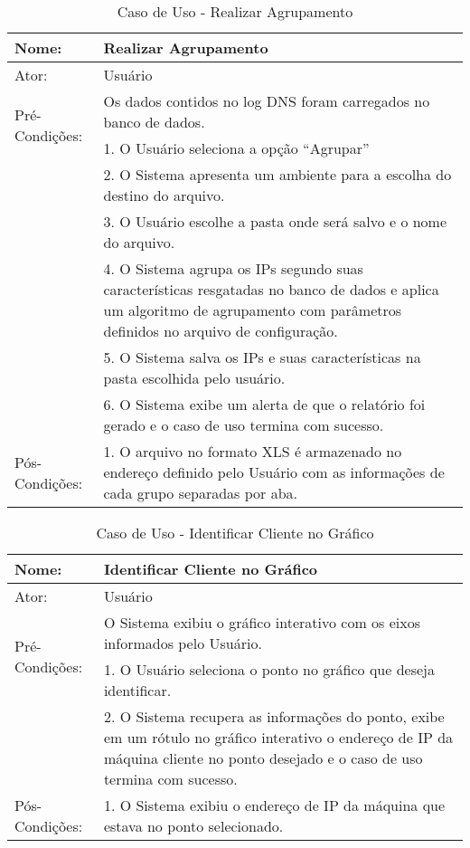 \begin{table}[]
\centering
\caption{Caso de Uso - Realizar Agrupamento}
\label{tab:use_case_clustering}
\begin{tabular}{|lp{10cm}|}
\hline
Nome: & Realizar Agrupamento  \\ \hline
Ator: & Usuário   \\ \hline
\multirow{2}{*}{Pré-Condições:} & Os dados contidos no log DNS foram carregados no banco de dados.  \\ \hline
\multirow{13}{*}{Fluxo Básico de Eventos:} & 1. O Usuário seleciona a opção ``Agrupar''  \\
 & 2. O Sistema apresenta um ambiente para a escolha do destino do arquivo. \\
 & 3. O Usuário escolhe a pasta onde será salvo e o nome do arquivo. \\
 & 4. O Sistema agrupa os IPs segundo suas características resgatadas no banco de dados e aplica um algoritmo de agrupamento com parâmetros definidos no arquivo de configuração.  \\
 & 5. O Sistema salva os IPs e suas características na pasta escolhida pelo usuário. \\
 & 6. O Sistema exibe um alerta de que o relatório foi gerado e o caso de uso termina com sucesso. \\
 \hline
\multirow{3}{*}{Pós-Condições:} & 1. O arquivo no formato XLS é armazenado no endereço definido pelo Usuário com as informações de cada grupo separadas por aba. \\
\hline
\end{tabular}
\end{table}

\begin{table}[]
\centering
\caption{Caso de Uso - Identificar Cliente no Gráfico}
\label{tab:use_case_identify}
\begin{tabular}{|lp{10cm}|}
\hline
Nome: & Identificar Cliente no Gráfico  \\ \hline
Ator: & Usuário   \\ \hline
\multirow{2}{*}{Pré-Condições:} & O Sistema exibiu o gráfico interativo com os eixos informados pelo Usuário.  \\ \hline
\multirow{6}{*}{Fluxo Básico de Eventos:} & 1. O Usuário seleciona o ponto no gráfico que deseja identificar.  \\
 & 2. O Sistema recupera as informações do ponto, exibe em um rótulo no gráfico interativo o endereço de IP da máquina cliente no ponto desejado e o caso de uso termina com sucesso. \\
 \hline
 \multirow{2}{*}{Pós-Condições:} & 1. O Sistema exibiu o endereço de IP da máquina que estava no ponto selecionado. \\
 \hline
\end{tabular}
\end{table}

